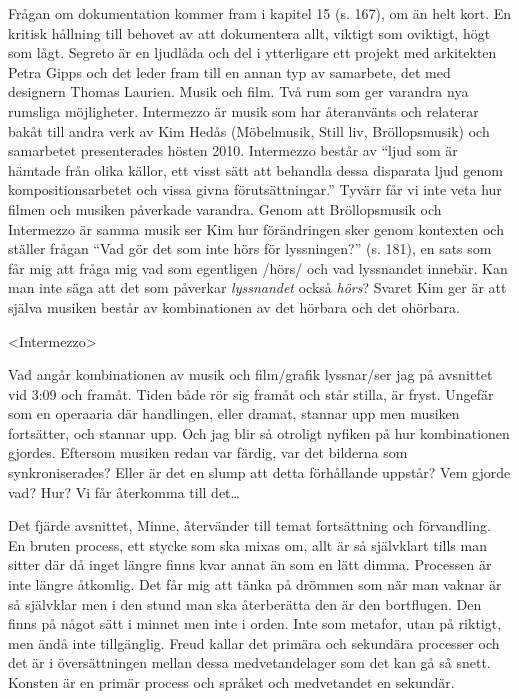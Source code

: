 \documentclass{article}
\begin{document}
Frågan om dokumentation kommer fram i kapitel 15 (s. 167), om än helt kort. En kritisk hållning till behovet av att dokumentera allt, viktigt som oviktigt, högt som lågt. Segreto är en ljudlåda och del i ytterligare ett projekt med arkitekten Petra Gipps och det leder fram till en annan typ av samarbete, det med designern Thomas Laurien. Musik och film. Två rum som ger varandra nya rumsliga möjligheter. Intermezzo är musik som har återanvänts och relaterar bakåt till andra verk av Kim Hedås (Möbelmusik, Still liv, Bröllopsmusik) och samarbetet presenterades hösten 2010. Intermezzo består av ``ljud som är hämtade från olika källor, ett visst sätt att behandla dessa disparata ljud genom kompositionsarbetet och vissa givna förutsättningar.'' Tyvärr får vi inte veta hur filmen och musiken påverkade varandra. Genom att Bröllopsmusik och Intermezzo är samma musik ser Kim hur förändringen sker genom kontexten och ställer frågan ``Vad gör det som inte hörs för lyssningen?'' (s. 181), en sats som får mig att fråga mig vad som egentligen /hörs/ och vad lyssnandet innebär. Kan man inte säga att det som påverkar \emph{lyssnandet} också \emph{hörs}? Svaret Kim ger är att själva musiken består av kombinationen av det hörbara och det ohörbara.

\textless{}Intermezzo\textgreater{}

Vad angår kombinationen av musik och film/grafik lyssnar/ser jag på avsnittet vid 3:09 och framåt. Tiden både rör sig framåt och står stilla, är fryst. Ungefär som en operaaria där handlingen, eller dramat, stannar upp men musiken fortsätter, och stannar upp. Och jag blir så otroligt nyfiken på hur kombinationen gjordes. Eftersom musiken redan var färdig, var det bilderna som synkroniserades? Eller är det en slump att detta förhållande uppstår? Vem gjorde vad? Hur? Vi får återkomma till det\dots{}

Det fjärde avsnittet, Minne, återvänder till temat fortsättning och förvandling. En bruten process, ett stycke som ska mixas om, allt är så självklart tills man sitter där då inget längre finns kvar annat än som en lätt dimma. Processen är inte längre åtkomlig. Det får mig att tänka på drömmen som när man vaknar är så självklar men i den stund man ska återberätta den är den bortflugen. Den finns på något sätt i minnet men inte i orden. Inte som metafor, utan på riktigt, men ändå inte tillgänglig. Freud kallar det primära och sekundära processer och det är i översättningen mellan dessa medvetandelager som det kan gå så snett. Konsten är en primär process och språket och medvetandet en sekundär.
\end{document}
